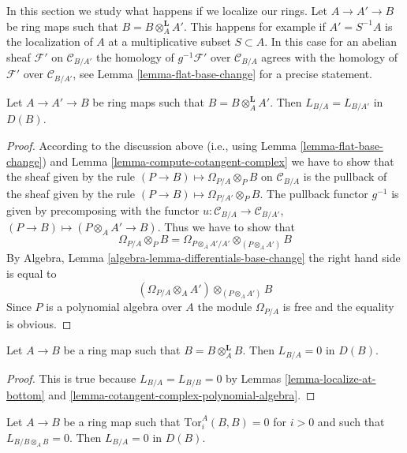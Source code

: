 \noindent
In this section we study what happens if we localize our rings.
Let $A \to A' \to B$ be ring maps such that $B = B \otimes_A^\mathbf{L} A'$.
This happens for example if $A' = S^{-1}A$ is the localization of $A$
at a multiplicative subset $S \subset A$. In this
case for an abelian sheaf $\mathcal{F}'$ on $\mathcal{C}_{B/A'}$
the homology of $g^{-1}\mathcal{F}'$ over $\mathcal{C}_{B/A}$ agrees with
the homology of $\mathcal{F}'$ over $\mathcal{C}_{B/A'}$, see
Lemma \ref{lemma-flat-base-change} for a precise statement.

\begin{lemma}
\label{lemma-localize-at-bottom}
Let $A \to A' \to B$ be ring maps such that $B = B \otimes_A^\mathbf{L} A'$.
Then $L_{B/A} = L_{B/A'}$ in $D(B)$.
\end{lemma}

\begin{proof}
According to the discussion above (i.e., using
Lemma \ref{lemma-flat-base-change})
and Lemma \ref{lemma-compute-cotangent-complex}
we have to show that the sheaf given
by the rule $(P \to B) \mapsto \Omega_{P/A} \otimes_P B$ on $\mathcal{C}_{B/A}$
is the pullback of the sheaf given by the rule
$(P \to B) \mapsto \Omega_{P/A'} \otimes_P B$.
The pullback functor $g^{-1}$ is given by precomposing with the
functor $u : \mathcal{C}_{B/A} \to \mathcal{C}_{B/A'}$,
$(P \to B) \mapsto (P \otimes_A A' \to B)$.
Thus we have to show that
$$
\Omega_{P/A} \otimes_P B =
\Omega_{P \otimes_A A'/A'} \otimes_{(P \otimes_A A')} B
$$
By Algebra, Lemma \ref{algebra-lemma-differentials-base-change}
the right hand side is equal to
$$
(\Omega_{P/A} \otimes_A A') \otimes_{(P \otimes_A A')} B
$$
Since $P$ is a polynomial algebra over $A$ the module
$\Omega_{P/A}$ is free and the equality is obvious.
\end{proof}

\begin{lemma}
\label{lemma-derived-diagonal}
Let $A \to B$ be a ring map such that $B = B \otimes_A^\mathbf{L} B$.
Then $L_{B/A} = 0$ in $D(B)$.
\end{lemma}

\begin{proof}
This is true because $L_{B/A} = L_{B/B} = 0$ by
Lemmas \ref{lemma-localize-at-bottom} and
\ref{lemma-cotangent-complex-polynomial-algebra}.
\end{proof}

\begin{lemma}
\label{lemma-bootstrap}
Let $A \to B$ be a ring map such that $\text{Tor}^A_i(B, B) = 0$ for $i > 0$
and such that $L_{B/B \otimes_A B} = 0$.
Then $L_{B/A} = 0$ in $D(B)$.
\end{lemma}

